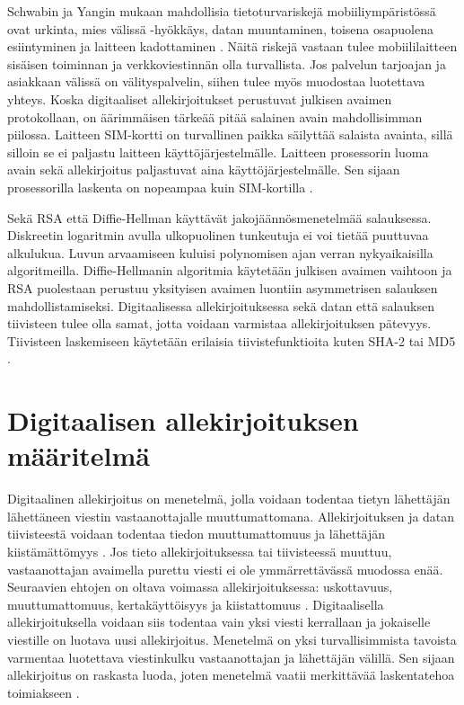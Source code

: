 \documentclass[finnish]{tktltiki2}
\theoremstyle{definition}
\theoremstyle{remark}
\begin{document}
Schwabin ja Yangin mukaan mahdollisia tietoturvariskejä mobiiliympäristössä ovat urkinta, mies välissä -hyökkäys, datan muuntaminen, toisena osapuolena esiintyminen ja laitteen kadottaminen \cite{enti}. Näitä riskejä vastaan tulee mobiililaitteen sisäisen toiminnan ja verkkoviestinnän olla turvallista. Jos palvelun tarjoajan ja asiakkaan välissä on välityspalvelin, siihen tulee myös muodostaa luotettava yhteys.
Koska digitaaliset allekirjoitukset perustuvat julkisen avaimen protokollaan, on äärimmäisen tärkeää pitää salainen avain mahdollisimman piilossa. Laitteen SIM-kortti on turvallinen paikka säilyttää salaista avainta, sillä silloin se ei paljastu laitteen käyttöjärjestelmälle. Laitteen prosessorin luoma avain sekä allekirjoitus paljastuvat aina käyttöjärjestelmälle. Sen sijaan prosessorilla laskenta on nopeampaa kuin SIM-kortilla \cite{proxy}. 

Sekä RSA että Diffie-Hellman käyttävät jakojäännösmenetelmää salauksessa.
Diskreetin logaritmin avulla ulkopuolinen tunkeutuja ei voi tietää puuttuvaa alkulukua. Luvun arvaamiseen kuluisi polynomisen ajan verran nykyaikaisilla algoritmeilla. Diffie-Hellmanin algoritmia käytetään julkisen avaimen vaihtoon ja RSA puolestaan perustuu yksityisen avaimen luontiin asymmetrisen salauksen mahdollistamiseksi. Digitaalisessa allekirjoituksessa sekä datan että salauksen tiivisteen tulee olla samat, jotta voidaan varmistaa allekirjoituksen pätevyys. Tiivisteen laskemiseen käytetään erilaisia tiivistefunktioita kuten SHA-2 tai MD5 \cite{gene}.         


\section{Digitaalisen allekirjoituksen määritelmä}

Digitaalinen allekirjoitus on menetelmä, jolla voidaan todentaa tietyn lähettäjän lähettäneen viestin vastaanottajalle muuttumattomana. Allekirjoituksen ja datan tiivisteestä voidaan todentaa tiedon muuttumattomuus ja  lähettäjän kiistämättömyys \cite{moen}. Jos tieto allekirjoituksessa tai tiivisteessä muuttuu, vastaanottajan avaimella purettu viesti ei ole ymmärrettävässä muodossa enää. Seuraavien ehtojen on oltava voimassa allekirjoituksessa: uskottavuus, muuttumattomuus, kertakäyttöisyys ja kiistattomuus \cite{e-c}. Digitaalisella allekirjoituksella voidaan siis todentaa vain yksi viesti kerrallaan ja jokaiselle viestille on luotava uusi allekirjoitus. Menetelmä on yksi turvallisimmista tavoista varmentaa luotettava viestinkulku vastaanottajan ja lähettäjän välillä. Sen sijaan allekirjoitus on raskasta luoda, joten menetelmä vaatii merkittävää laskentatehoa toimiakseen \cite{proxy}.
\end{document}

